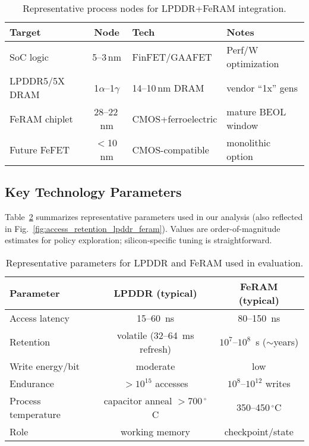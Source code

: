 \begin{table}[t]
  \centering
  \caption{Representative process nodes for LPDDR+FeRAM integration.}
  \label{tab:node_mapping}
  \vspace{2pt}
  \small
  \setlength{\tabcolsep}{5pt}
  \begin{tabular}{@{}lcll@{}}
    \toprule
    \textbf{Target} & \textbf{Node} & \textbf{Tech} & \textbf{Notes} \\
    \midrule
    SoC logic & 5--3\,nm & FinFET/GAAFET & Perf/W optimization \\
    LPDDR5/5X DRAM & 1$\alpha$--1$\gamma$ & 14--10\,nm DRAM & vendor “1x” gens \\
    FeRAM chiplet & 28--22\,nm & CMOS+ferroelectric & mature BEOL window \\
    Future FeFET & $<$10\,nm & CMOS-compatible & monolithic option \\
    \bottomrule
  \end{tabular}
\end{table}

\subsection{Key Technology Parameters}
Table~\ref{tab:tech_params} summarizes representative parameters used in our analysis (also reflected in Fig.~\ref{fig:access_retention_lpddr_feram}).
Values are order-of-magnitude estimates for policy exploration; silicon-specific tuning is straightforward.

\begin{table}[t]
  \centering
  \caption{Representative parameters for LPDDR and FeRAM used in evaluation.}
  \label{tab:tech_params}
  \vspace{2pt}
  \small
  \setlength{\tabcolsep}{5pt}
  \begin{tabular}{@{}lcc@{}}
    \toprule
    Parameter & LPDDR (typical) & FeRAM (typical) \\
    \midrule
    Access latency & 15--60~ns & 80--150~ns \\
    Retention & volatile (32--64~ms refresh) & $10^7$--$10^8$~s ($\sim$years) \\
    Write energy/bit & moderate & low \\
    Endurance & $>10^{15}$ accesses & $10^8$--$10^{12}$ writes \\
    Process temperature & capacitor anneal $>700\,^\circ$C & 350--450$\,^\circ$C \\
    Role & working memory & checkpoint/state \\
    \bottomrule
  \end{tabular}
\end{table}


